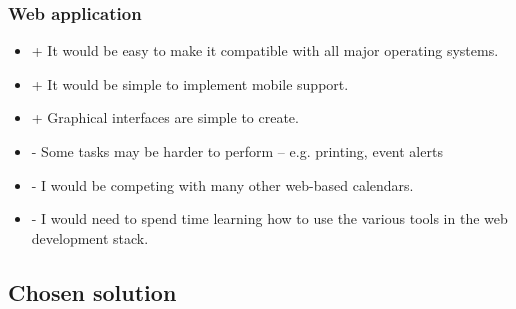 

\subsubsection{Web application}

\begin{itemize}
  \item + It would be easy to make it compatible with all major operating
          systems.
  \item + It would be simple to implement mobile support.
  \item + Graphical interfaces are simple to create.
  \item - Some tasks may be harder to perform -- e.g. printing, event alerts
  \item - I would be competing with many other web-based calendars.
  \item - I would need to spend time learning how to use the various tools in
          the web development stack.
\end{itemize}


\subsection{Chosen solution}


